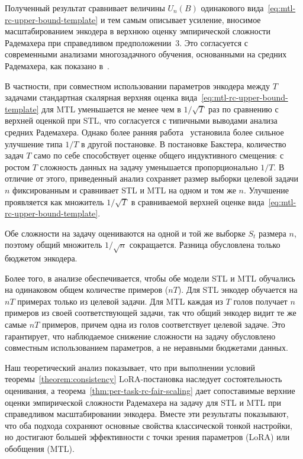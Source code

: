 Полученный результат сравнивает величины $U_n(B)$ одинакового вида~\eqref{eq:mtl-rc-upper-bound-template} и тем самым описывает усиление, вносимое масштабированием энкодера в верхнюю оценку эмпирической сложности Радемахера при справедливом предположении~3.
Это согласуется с современными анализами многозадачного обучения, основанными на средних Радемахера, как показано в~\cite{maurer2006}.

В частности, при совместном использовании параметров энкодера между $T$ задачами стандартная скалярная верхняя оценка вида~\eqref{eq:mtl-rc-upper-bound-template} для MTL уменьшается не менее чем в $1/\sqrt{T}$ раз по сравнению с верхней оценкой при STL, что согласуется с типичными выводами анализа средних Радемахера.
Однако более ранняя работа~\cite{baxter2000} установила более сильное улучшение типа $1/T$ в другой постановке.
В постановке Бакстера, количество задач $T$ само по себе способствует оценке общего индуктивного смещения: с ростом $T$ сложность данных на задачу уменьшается пропорционально $1/T$.
В отличие от этого, приведенный анализ сохраняет размер выборки целевой задачи $n$ фиксированным и сравнивает STL и MTL на одном и том же $n$. Улучшение проявляется как множитель $1/\sqrt{T}$ в сравниваемой верхней оценке вида~\eqref{eq:mtl-rc-upper-bound-template}.

Обе сложности на задачу оцениваются на одной и той же выборке $S_t$ размера $n$, поэтому общий множитель $1/\sqrt{n}$ сокращается. Разница обусловлена только бюджетом энкодера.

Более того, в анализе обеспечивается, чтобы обе модели STL и MTL обучались на одинаковом общем количестве примеров ($nT$).
Для STL энкодер обучается на $nT$ примерах только из целевой задачи.
Для MTL каждая из $T$ голов получает $n$ примеров из своей соответствующей задачи, так что общий энкодер видит те же самые $nT$ примеров, причем одна из голов соответствует целевой задаче.
Это гарантирует, что наблюдаемое снижение сложности на задачу обусловлено совместным использованием параметров, а не неравными бюджетами данных.

Наш теоретический анализ показывает, что при выполнении условий теоремы~\ref{theorem:consistency} LoRA-постановка наследует состоятельность оценивания, а теорема~\ref{thm:per-task-rc-fair-scaling} дает сопоставимые верхние оценки эмпирической сложности Радемахера на задачу для STL и MTL при справедливом масштабировании энкодера.
Вместе эти результаты показывают, что оба подхода сохраняют основные свойства классической тонкой настройки, но достигают большей эффективности с точки зрения параметров (LoRA) или обобщения (MTL).

